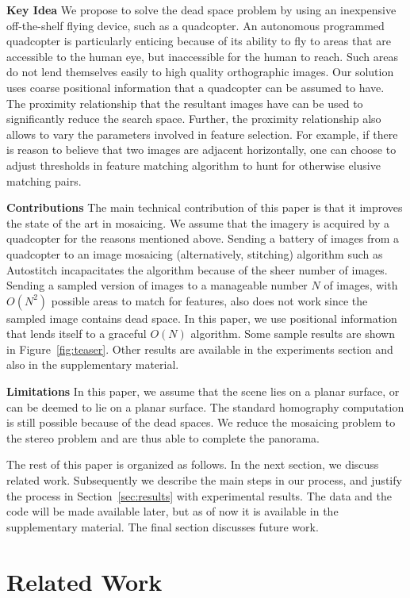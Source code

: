 \documentclass[10pt,twocolumn,letterpaper]{article}
\begin{document}
{\bf Key Idea} We propose to solve the dead space problem by using an
inexpensive off-the-shelf flying device, such as a quadcopter.  An
autonomous programmed quadcopter is particularly enticing because of
its ability to fly to areas that are accessible to the human eye, but
inaccessible for the human to reach.  Such areas do not lend
themselves easily to high quality orthographic images. Our solution
uses coarse positional information that a quadcopter can be assumed to
have.  The proximity relationship that the resultant images have can
be used to significantly reduce the search space.  Further, the
proximity relationship also allows to vary the parameters involved in
feature selection. For example, if there is reason to believe that two
images are adjacent horizontally, one can choose to adjust
thresholds in feature matching algorithm to hunt for otherwise elusive
matching pairs. 

{\bf Contributions} The main technical contribution of this paper is
that it improves the state of the art in mosaicing.  We assume that
the imagery is acquired by a quadcopter for the reasons mentioned
above. Sending a battery of images from a quadcopter to an image
mosaicing (alternatively, stitching) algorithm such as Autostitch
incapacitates the algorithm because of the sheer number of
images. Sending a sampled version of images to a manageable number $N$
of images, with $O(N^2)$ possible areas to match for features, also
does not work since the sampled image contains dead space.  In this
paper, we use positional information that lends itself to a graceful
$O(N)$ algorithm.  Some sample results are shown in Figure~\ref{fig:teaser}.
Other results are available in the experiments section and also in the
supplementary material.

{\bf Limitations} In this paper, we assume that the scene lies on a
planar surface, or can be deemed to lie on a planar surface. The
standard homography computation is still possible because of the dead
spaces.  We reduce the mosaicing problem to the stereo problem and are
thus able to complete the panorama.

The rest of this paper is organized as follows.  In the next section,
we discuss related work.  Subsequently we describe the main steps in
our process, and justify the process in Section~\ref{sec:results} with
experimental results.  The data and the code will be made available
later, but as of now it is available in the supplementary material.
The final section discusses future work.

\section{Related Work}
\end{document}
